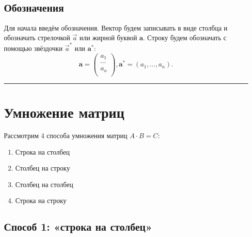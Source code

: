 \documentclass[11pt,a4paper]{article}
\renewcommand{\linethickness}{0.1ex}
\providecommand{\tightlist}{%
      \setlength{\itemsep}{0pt}\setlength{\parskip}{0pt}}
\begin{document}
    \hypertarget{ux43eux431ux43eux437ux43dux430ux447ux435ux43dux438ux44f}{%
\subsection{Обозначения}\label{ux43eux431ux43eux437ux43dux430ux447ux435ux43dux438ux44f}}

Для начала введём обозначения. Вектор будем записывать в виде столбца и
обозначать стрелочкой \(\vec{a}\) или жирной буквой \(\mathbf{a}\).
Строку будем обозначать с помощью звёздочки \(\vec{a}^*\) или
\(\mathbf{a}^*\): \[
  \mathbf{a} =
  \begin{pmatrix}
     a_1    \\
     \cdots \\
     a_n    \\
  \end{pmatrix},
  \mathbf{a}^* = (a_1, \ldots, a_n).
\]

    \begin{center}\rule{0.5\linewidth}{\linethickness}\end{center}

    \hypertarget{ux443ux43cux43dux43eux436ux435ux43dux438ux435-ux43cux430ux442ux440ux438ux446}{%
\section{Умножение
матриц}\label{ux443ux43cux43dux43eux436ux435ux43dux438ux435-ux43cux430ux442ux440ux438ux446}}

Рассмотрим 4 способа умножения матриц \(A \cdot B = C\):

\begin{enumerate}
\def\labelenumi{\arabic{enumi}.}
\tightlist
\item
  Строка на столбец
\item
  Столбец на строку
\item
  Столбец на столбец
\item
  Строка на строку
\end{enumerate}

    \hypertarget{ux441ux43fux43eux441ux43eux431-1-ux441ux442ux440ux43eux43aux430-ux43dux430-ux441ux442ux43eux43bux431ux435ux446}{%
\subsection{Способ 1: «строка на
столбец»}\label{ux441ux43fux43eux441ux43eux431-1-ux441ux442ux440ux43eux43aux430-ux43dux430-ux441ux442ux43eux43bux431ux435ux446}}
\end{document}
